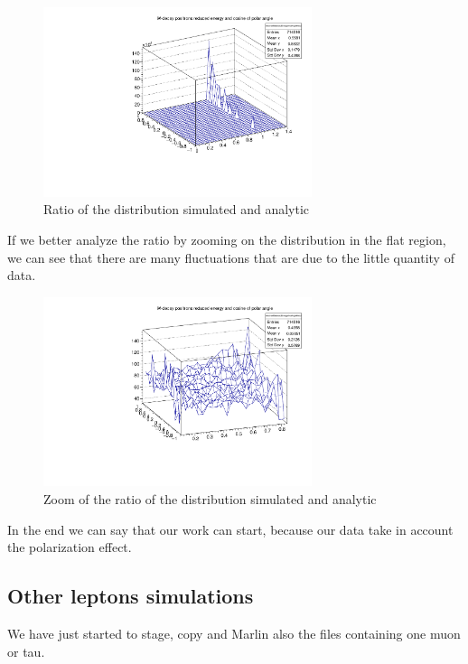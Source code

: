 \begin{figure} [ht!]
  \centering
  \includegraphics[width=0.7\textwidth]{02_Ratio_MC_An.pdf}
 \caption{Ratio of the distribution simulated and analytic}
 \label{02_Energy_angle_ratio}
\end{figure}

If we better analyze the ratio by zooming on the distribution in the flat region, we can see that there are many fluctuations that are due to the little quantity of data. 

\begin{figure} [ht!]
  \centering
  \includegraphics[width=0.7\textwidth]{02_Ratio_MC_An_zoom.pdf}
 \caption{Zoom of the ratio of the distribution simulated and analytic}
 \label{02_Energy_angle_ratio_zoom}
\end{figure}

In the end we can say that our work can start, because our data take in account the polarization effect.

\subsection{Other leptons simulations}

We have just started to stage, copy and Marlin also the files containing one muon or tau.